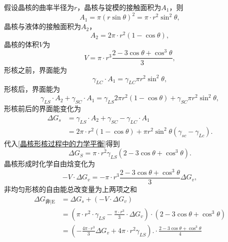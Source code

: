             假设晶核的曲率半径为$r$，晶核与锭模的接触面积为$A_1$，则
            \begin{equation}
                A_1=\pi\left( r\sin\theta \right)^2=\pi\cdot r^2\sin^2\theta,
            \end{equation}
            晶核与液体的接触面积为$A_2$，
            \begin{equation}
                A_2=2\pi\cdot r^2(1-\cos\theta),
            \end{equation}
            晶核的体积$V$为
            \begin{equation}
                V=\pi\cdot r^3\frac{2-3\cos\theta+\cos^3\theta}{3},
            \end{equation}
            形核之前，界面能为
            \begin{equation}
                \gamma_{LC}\cdot A_1=\gamma_{LC}\pi r^2\sin^2\theta,
            \end{equation}
            形核后，界面能为
            \begin{equation}
                \gamma_{LS}\cdot A_2+\gamma_{SC}\cdot A_1=\gamma_{LS}2\pi r^2(1-\cos\theta)+\gamma_{SC}\pi r^2\sin^2\theta,
            \end{equation}
            形核前后的界面能变化为
            \begin{equation}
                \begin{aligned}
                    \Delta G_s&=\gamma_{LS}\cdot A_2+\gamma_{SC}- \gamma_{LC}\cdot A_1\\
                    &=2 \pi \cdot r^{2}(1-\cos \theta)+\pi r^{2} \sin ^{2} \theta\left(\gamma_{s c}-\gamma_{L c}\right).
                \end{aligned}
            \end{equation}
            代入\autoref{晶核形核过程中的力学平衡}得到
            \begin{equation}
                \Delta G_{S}=\pi \cdot r^{2} \gamma_{L S}\left(2-3 \cos \theta+\cos ^{3} \theta\right).
            \end{equation}
            晶核形成时化学自由焓变化为
            \begin{equation}
                -V \cdot \Delta G_{v}=-\pi \cdot r^{3} \frac{2-3 \cos \theta+\cos ^{3} \theta}{3} \Delta G_{v},
            \end{equation}
            非均匀形核的自由能总改变量为上两项之和
            \begin{equation}
            \begin{aligned} 
                \Delta G_{\text{非}| \mathrm{E}} &=\Delta G_{s}+\left(-V \cdot \Delta G_{v}\right) \\ 
                &=\left(\pi \cdot r^{2} \cdot \gamma_{L S}-\frac{\pi \cdot r^{3}}{3} \cdot \Delta G_{v}\right) \cdot\left(2-3 \cos \theta+\cos ^{3} \theta\right) \\ 
                &=\left(-\frac{4 \pi \cdot r^{3}}{3} \Delta G_{v}+4 \pi \cdot r^{2} \gamma_{L S}\right). \cdot \frac{2-3 \cos \theta+\cos ^{3} \theta}{4} 
            \end{aligned}
            \end{equation}
